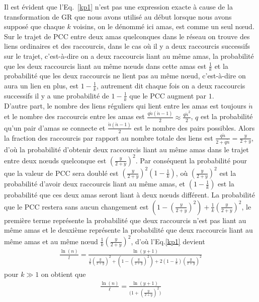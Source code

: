 Il est évident que l'Eq.~\ref{kp1} n'est pas une expression exacte à cause de la transformation de GR que nous avons utilisé au début lorsque nous avons supposé que chaque $k$ voisins, on le dénommé ici \textsf{amas}, est comme  un seul nœud.\\
Sur le trajet de PCC entre deux amas quelconques dans le réseau on trouve des liens ordinaires et des raccourcis, dans le cas où il y a deux raccourcis successifs sur le trajet, c'est-à-dire on a deux raccourcis liant au m\^{e}me \textsf{amas}, la probabilité que les deux raccourcis liant au m\^{e}me nœuds dans cette amas est $\frac{1}{k}$ et la probabilité que les deux raccourcis ne lient pas au m\^{e}me nœud, c'est-à-dire on aura un lien en plus, est  $1-\frac{1}{k}$, autrement dit chaque fois on a deux raccourcis successifs il y a une probabilité de $1-\frac{1}{k}$ que le PCC augment par $1$.\\
D'autre part, le nombre des liens réguliers qui lient entre les \textsf{amas} est toujours
$\acute{n}$ et le nombre des raccourcis entre les \textsf{amas} est $\frac{q\acute{n}(\acute{n}-1)}{2}\approx\frac{q\acute{n}^2}{2}$, 
$q$ est la probabilité qu'un pair d'amas se connecte et $\frac{\acute{n}(\acute{n}-1)}{2}$ est le nombre des pairs possibles. Alors la fraction des raccourcis par rapport au nombre totale des liens est $\frac{q\acute{n}}{2+q\acute{n}}=\frac{y}{2+y}$, d'où la probabilité d'obtenir deux raccourcis liant au m\^{e}me \textsf{amas} dans le trajet entre deux nœuds quelconque est $(\frac{y}{2+y})^2$. Par conséquent la probabilité pour que la valeur de PCC sera doublé est $(\frac{y}{2+y})^2(1-\frac{1}{k})$, où $(\frac{y}{2+y})^2$ est la probabilité d'avoir deux 
raccourcis liant au m\^{e}me \textsf{amas}, et $(1-\frac{1}{k})$ est la probabilité que ces deux amas seront liant à deux nœuds différent. La probabilité que le PCC restera sans aucun changement est $(1-(\frac{y}{2+y})^2)+\frac{1}{k}(\frac{y}{2+y})^2$, le première terme représente la probabilité que deux raccourcis n'est pas liant au m\^{e}me \textsf{amas} et le deuxième représente la probabilité 
que deux raccourcis liant au m\^{e}me \textsf{amas} et au m\^{e}me nœud $\frac{1}{k}(\frac{y}{2+y})^2$, d'où l'Eq.\ref{kp1} devient
\begin{eqnarray}
\frac{\ln(n)}{l}=\frac{\ln(y+1)}{\frac{1}{k}(\frac{y}{2+y})^2+(1-(\frac{y}{2+y})^2)+2(1-\frac{1}{k})(\frac{y}{2+y})^2}
\end{eqnarray}
pour $k\gg1$ on obtient que
\begin{eqnarray}
\frac{\ln(n)}{\ell}=\frac{\ln(y+1)}{\big(1+(\frac{y}{2+y})^2\big)}
\label{kp2}
\end{eqnarray}
